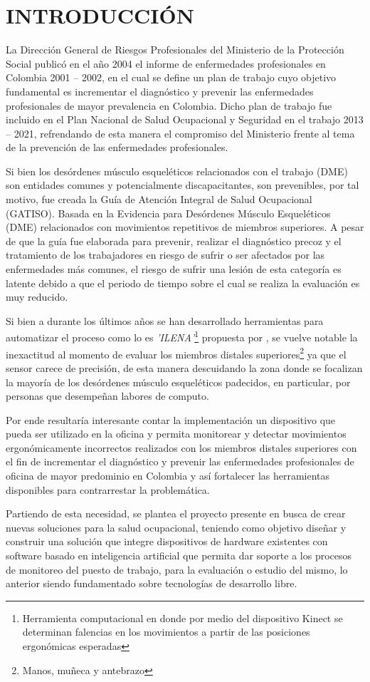 \newpage
\chapter{INTRODUCCIÓN} 
La Dirección General de Riesgos Profesionales del Ministerio de la Protección Social publicó en el año 2004 el informe de enfermedades profesionales en Colombia 2001 – 2002, en el cual se define un plan de trabajo cuyo objetivo fundamental es incrementar el diagnóstico y prevenir las enfermedades profesionales de mayor prevalencia en Colombia. Dicho plan de trabajo fue incluido en el Plan Nacional de Salud Ocupacional y Seguridad en el trabajo 2013 – 2021, refrendando de esta manera el compromiso del Ministerio frente al tema de la prevención de las enfermedades profesionales.

Si bien los desórdenes músculo esqueléticos relacionados con el trabajo (DME) son entidades comunes y potencialmente discapacitantes, son prevenibles, por tal motivo, fue creada la Guía de Atención Integral de Salud Ocupacional (GATISO). Basada en la Evidencia para Desórdenes Músculo Esqueléticos (DME) relacionados con movimientos repetitivos de miembros superiores. A pesar de que la guía fue elaborada para prevenir, realizar el diagnóstico precoz y el tratamiento de los trabajadores en riesgo de sufrir o ser afectados por las enfermedades más comunes, el riesgo de sufrir una lesión de esta categoría es latente debido a que el periodo de tiempo sobre el cual se realiza la evaluación es muy reducido.

Si bien a durante los últimos años se han desarrollado herramientas para automatizar el proceso como lo es \textit{'ILENA'}\footnote{Herramienta computacional en donde por medio del dispositivo Kinect se determinan falencias en los movimientos a partir de las posiciones ergonómicas esperadas} propuesta por \parencite{Moya2015ModeloOcupacional} , se vuelve notable la inexactitud al momento de evaluar los miembros distales superiores\footnote{Manos, muñeca y antebrazo} ya que el sensor carece de precisión, de esta manera descuidando la zona donde se focalizan la mayoría de los desórdenes músculo esqueléticos padecidos, en particular, por personas que desempeñan labores de computo.

Por ende resultaría interesante contar la implementación un dispositivo que pueda ser utilizado en la oficina y permita monitorear y detectar movimientos ergonómicamente incorrectos realizados con los miembros distales superiores con el fin de incrementar el diagnóstico y prevenir las enfermedades profesionales de oficina de mayor predominio en Colombia y así fortalecer las herramientas disponibles para contrarrestar la problemática.

Partiendo de esta necesidad, se plantea el proyecto presente en busca de crear nuevas soluciones para la salud ocupacional, teniendo como objetivo diseñar y construir una solución que integre dispositivos de hardware existentes con software basado en inteligencia artificial que permita dar soporte a los procesos de monitoreo del puesto de trabajo, para la evaluación o estudio del mismo, lo anterior siendo fundamentado sobre tecnologías de desarrollo libre.